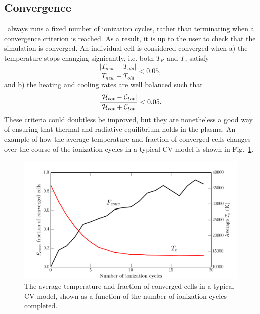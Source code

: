 \subsection{Convergence}

\label{sec:convergence}

\py\ always runs a fixed number of ionization cycles, rather than terminating
when a convergence criterion is reached. As a result, it is up to the user
to check that the simulation is converged. An individual cell is considered
converged when a) the temperature stops changing signicantly, i.e. both
$T_R$ and $T_e$ satisfy
\begin{equation}
\frac{|T_{new} - T_{old}|}{T_{new} + T_{old}} < 0.05,
\end{equation}
and b) the heating and cooling rates are well balanced such that
\begin{equation}
\frac{|{\cal H}_{tot} - {\cal C}_{tot}|}{{\cal H}_{tot} + {\cal C}_{tot}} < 0.05.
\end{equation}
These criteria could doubtless be improved, but they are nonetheless
a good way of ensuring that thermal and radiative equilibrium holds in the 
plasma. An example of how the average temperature and fraction
of converged cells changes over the course of the ionization cycles in
a typical CV model is shown in Fig.~\ref{fig:conv}.


\begin{figure}
\centering
\includegraphics[width=1.0\textwidth]{figures/03-radtrans/graph_conv.png}
\caption
{
The average temperature and fraction of converged cells in
a typical CV model, shown as a function of the number of ionization cycles
completed. 
} 
\label{fig:conv}
\end{figure}




